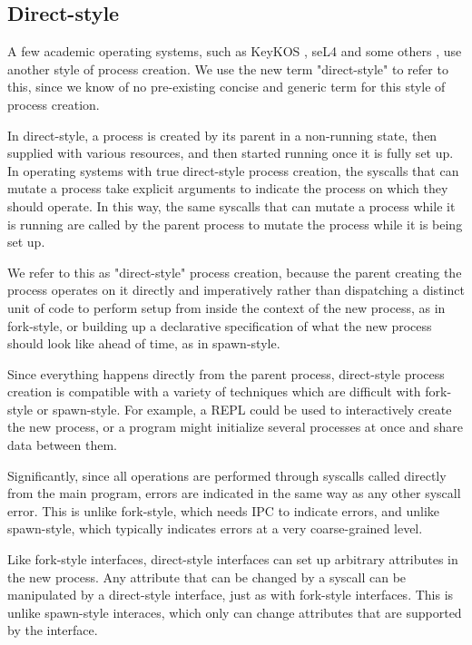 \documentclass[letterpaper,twocolumn,10pt]{article}
\begin{document}
\subsection{Direct-style}
A few academic operating systems, such as KeyKOS \cite{keykos}, seL4 \cite{sel4}
and some others \cite{exokernel} \cite{fuschia} \cite{singularity},
use another style of process creation.
We use the new term "direct-style" to refer to this,
since we know of no pre-existing concise and generic term for this style of process creation.

In direct-style, a process is created by its parent in a non-running state,
then supplied with various resources,
and then started running once it is fully set up.
In operating systems with true direct-style process creation,
the syscalls that can mutate a process
take explicit arguments to indicate the process on which they should operate.
In this way, the same syscalls that can mutate a process while it is running
are called by the parent process to mutate the process while it is being set up.

We refer to this as "direct-style" process creation,
because the parent creating the process operates on it directly and imperatively
rather than dispatching a distinct unit of code to perform setup from inside the context of the new process,
as in fork-style,
or building up a declarative specification of what the new process should look like ahead of time,
as in spawn-style.

Since everything happens directly from the parent process,
direct-style process creation is compatible with a variety of techniques
which are difficult with fork-style or spawn-style.
For example, a REPL could be used to interactively create the new process,
or a program might initialize several processes at once and share data between them.

Significantly,
since all operations are performed through syscalls called directly from the main program,
errors are indicated in the same way as any other syscall error.
This is unlike fork-style, which needs IPC to indicate errors,
and unlike spawn-style, which typically indicates errors at a very coarse-grained level.

Like fork-style interfaces,
direct-style interfaces can set up arbitrary attributes in the new process.
Any attribute that can be changed by a syscall
can be manipulated by a direct-style interface,
just as with fork-style interfaces.
This is unlike spawn-style interaces,
which only can change attributes that are supported by the interface.
\end{document}
